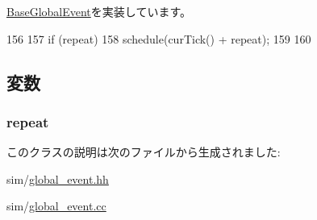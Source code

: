 \hyperlink{classBaseGlobalEvent_a142b75b68a6291400e20fb0dd905b1c8}{BaseGlobalEvent}を実装しています。


\begin{DoxyCode}
156 {
157     if (repeat) {
158         schedule(curTick() + repeat);
159     }
160 }
\end{DoxyCode}


\subsection{変数}
\hypertarget{classGlobalSyncEvent_a186e97c430ff343e8ab14129eaa8375d}{
\subsubsection[{repeat}]{ {\bf repeat}}}
\label{classGlobalSyncEvent_a186e97c430ff343e8ab14129eaa8375d}


このクラスの説明は次のファイルから生成されました:\begin{DoxyCompactItemize}
\item 
sim/\hyperlink{global__event_8hh}{global\_\-event.hh}\item 
sim/\hyperlink{global__event_8cc}{global\_\-event.cc}\end{DoxyCompactItemize}

